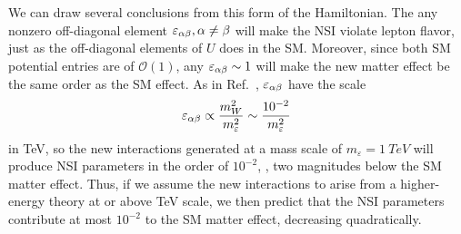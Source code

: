 \documentclass[twocolumn]{article}
\begin{document}
We can draw several conclusions from this form of the Hamiltonian. The any nonzero off-diagonal element $\varepsilon_{\alpha\beta}, \alpha \neq \beta$ will make the NSI violate lepton flavor, just as the off-diagonal elements of $U$ does in the SM. Moreover, since both SM potential entries are of $\mathcal{O}(1)$, any $\varepsilon_{\alpha\beta} \sim 1$ will make the new matter effect be the same order as the SM effect.
As in Ref.~\cite{tommyNSI}, $\varepsilon_{\alpha\beta}$ have the scale
\begin{align}
    \varepsilon_{\alpha\beta} \propto \frac{m_W^2}{m_{\varepsilon}^2} \sim \frac{10^{-2}}{m_\varepsilon^2}\,
\end{align} 
in TeV, so the new interactions generated at a mass scale of $m_\varepsilon = \SI{1}{TeV}$ will produce NSI parameters in the order of $10^{-2}$, , two magnitudes below the SM matter effect. Thus, if we assume the new interactions to arise from a higher-energy theory at or above TeV scale, we then predict that the NSI parameters contribute at most $10^{-2}$ to the SM matter effect, decreasing quadratically. 


\end{document}
